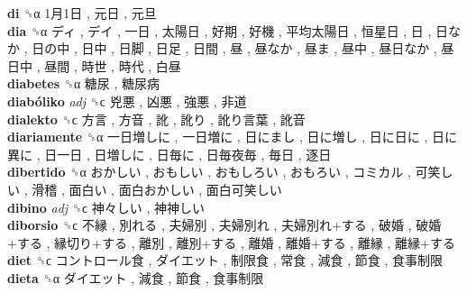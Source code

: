 \textbf{di} ␝α   1月1日 ,  元日 ,  元旦   \\
\textbf{dia} ␝α   ディ ,  デイ ,  一日 ,  太陽日 ,  好期 ,  好機 ,  平均太陽日 ,  恒星日 ,  日 ,  日なか ,  日の中 ,  日中 ,  日脚 ,  日足 ,  日間 ,  昼 ,  昼なか ,  昼ま ,  昼中 ,  昼日なか ,  昼日中 ,  昼間 ,  時世 ,  時代 ,  白昼   \\
\textbf{diabetes} ␝α   糖尿 ,  糖尿病   \\
\textbf{diabóliko} \emph{adj}  ␝ϲ   兇悪 ,  凶悪 ,  強悪 ,  非道   \\
\textbf{dialekto} ␝ϲ   方言 ,  方音 ,  訛 ,  訛り ,  訛り言葉 ,  訛音   \\
\textbf{diariamente} ␝α   一日増しに ,  一日増に ,  日にまし ,  日に増し ,  日に日に ,  日に異に ,  日一日 ,  日増しに ,  日毎に ,  日毎夜毎 ,  毎日 ,  逐日   \\
\textbf{dibertido} ␝α   おかしい ,  おもしい ,  おもしろい ,  おもろい ,  コミカル ,  可笑しい ,  滑稽 ,  面白い ,  面白おかしい ,  面白可笑しい   \\
\textbf{dibino} \emph{adj}  ␝ϲ   神々しい ,  神神しい   \\
\textbf{diborsio} ␝ϲ   不縁 ,  別れる ,  夫婦別 ,  夫婦別れ ,  夫婦別れ+する ,  破婚 ,  破婚+する ,  縁切り+する ,  離別 ,  離別+する ,  離婚 ,  離婚+する ,  離縁 ,  離縁+する   \\
\textbf{diet} ␝ϲ   コントロール食 ,  ダイエット ,  制限食 ,  常食 ,  減食 ,  節食 ,  食事制限   \\
\textbf{dieta} ␝α   ダイエット ,  減食 ,  節食 ,  食事制限   \\

